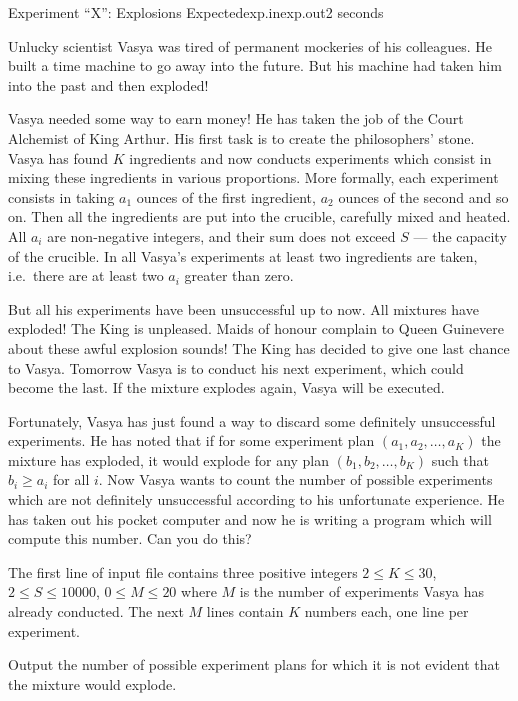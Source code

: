 \begin{problem}{Experiment ``X'': Explosions Expected}{exp.in}{exp.out}{2 seconds}

Unlucky scientist Vasya was tired of permanent mockeries of his
colleagues. He built a time machine to go away into the future.
But his machine had taken him into the past and then exploded!

Vasya needed some way to earn money! He has taken the job of the 
Court Alchemist of King Arthur. His first task is to create
the philosophers' stone. Vasya has found $K$ ingredients and now conducts
experiments which consist in mixing these ingredients in various proportions.
More formally, each experiment consists in taking $a_1$ ounces of the
first ingredient, $a_2$ ounces of the second and so on. Then all the 
ingredients are put into the crucible, carefully mixed and heated. 
All $a_i$ are non-negative integers, and their sum does not exceed $S$ --- 
the capacity of the crucible. In all Vasya's experiments at least two 
ingredients are taken, i.e.~there are at least two $a_i$ 
greater than zero.

But all his experiments have been unsuccessful up to now. All mixtures have exploded! 
The King is unpleased. Maids of honour complain to Queen Guinevere about these awful
explosion sounds! The King has decided to give one last chance to Vasya. Tomorrow Vasya 
is to conduct his next experiment, which could become the last. If the mixture 
explodes again, Vasya will be executed.

Fortunately, Vasya has just found a way to discard some definitely unsuccessful 
experiments. He has noted that if for some experiment plan 
$(a_1, a_2, \ldots, a_K)$ 
the mixture has exploded, it would explode for any plan 
$(b_1, b_2, \ldots, b_K)$ such that $b_i\ge a_i$ for all $i$. Now Vasya 
wants to count the number of possible experiments which are not definitely 
unsuccessful according to his unfortunate experience. 
He has taken out his pocket computer and now 
he is writing a program which will compute this number. Can you do this?

\InputFile

The first line of input file contains three positive integers $2\le K\le 30$,
$2\le S\le 10000$, $0\le M\le 20$ where $M$ is the number of experiments 
Vasya has already conducted. 
The next $M$ lines contain $K$ numbers each, one line per experiment.

\OutputFile

Output the number of possible experiment plans for which it is not evident 
that the mixture would explode.

\Example

\begin{example}
\end{example}

\end{problem}
